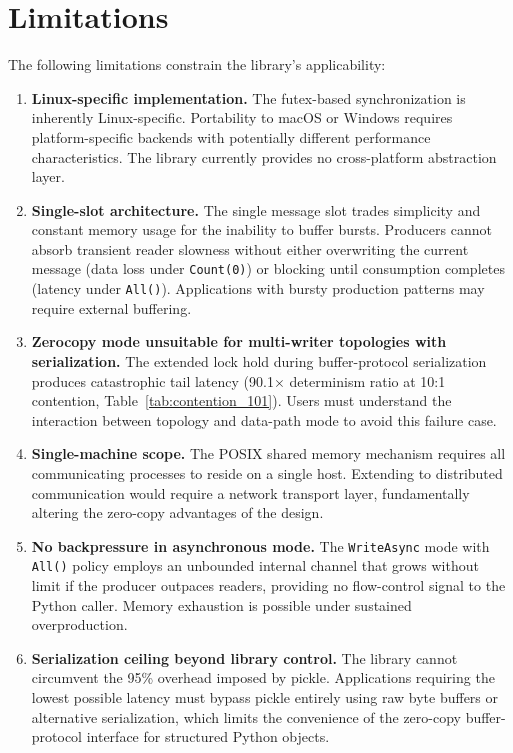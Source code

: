 \section{Limitations}

The following limitations constrain the library's applicability:

\begin{enumerate}
    \item \textbf{Linux-specific implementation.} The futex-based synchronization is inherently Linux-specific. Portability to macOS or Windows requires platform-specific backends with potentially different performance characteristics. The library currently provides no cross-platform abstraction layer.

    \item \textbf{Single-slot architecture.} The single message slot trades simplicity and constant memory usage for the inability to buffer bursts. Producers cannot absorb transient reader slowness without either overwriting the current message (data loss under \texttt{Count(0)}) or blocking until consumption completes (latency under \texttt{All()}). Applications with bursty production patterns may require external buffering.

    \item \textbf{Zerocopy mode unsuitable for multi-writer topologies with serialization.} The extended lock hold during buffer-protocol serialization produces catastrophic tail latency (90.1$\times$ determinism ratio at 10:1 contention, Table~\ref{tab:contention_101}). Users must understand the interaction between topology and data-path mode to avoid this failure case.

    \item \textbf{Single-machine scope.} The POSIX shared memory mechanism requires all communicating processes to reside on a single host. Extending to distributed communication would require a network transport layer, fundamentally altering the zero-copy advantages of the design.

    \item \textbf{No backpressure in asynchronous mode.} The \texttt{WriteAsync} mode with \texttt{All()} policy employs an unbounded internal channel that grows without limit if the producer outpaces readers, providing no flow-control signal to the Python caller. Memory exhaustion is possible under sustained overproduction.

    \item \textbf{Serialization ceiling beyond library control.} The library cannot circumvent the 95\% overhead imposed by pickle. Applications requiring the lowest possible latency must bypass pickle entirely using raw byte buffers or alternative serialization, which limits the convenience of the zero-copy buffer-protocol interface for structured Python objects.
\end{enumerate}

